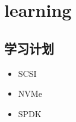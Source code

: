 \chapter{learning}

\section{学习计划}

\begin{itemize}
    \item SCSI
    \item NVMe
    \item SPDK
\end{itemize}

